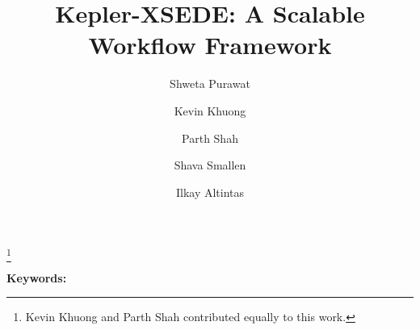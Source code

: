 \documentclass[letterpaper,10pt]{article}
\begin{document}
\title{Kepler-XSEDE: A Scalable Workflow Framework}
\author[1]{Shweta Purawat}
\author[2]{Kevin Khuong}
\author[2]{Parth Shah}
\author[1]{Shava Smallen}
\author[1]{Ilkay Altintas}
\thanks{Kevin Khuong and Parth Shah contributed equally to this work.}
\renewcommand\Authands{ and }
\date{}
\maketitle
\thispagestyle{empty}

\thispagestyle{plain}
\pagestyle{plain}
\setcounter{page}{1}

\begin{abstract}

\end{abstract}
{\bf Keywords:}



\end{document}

